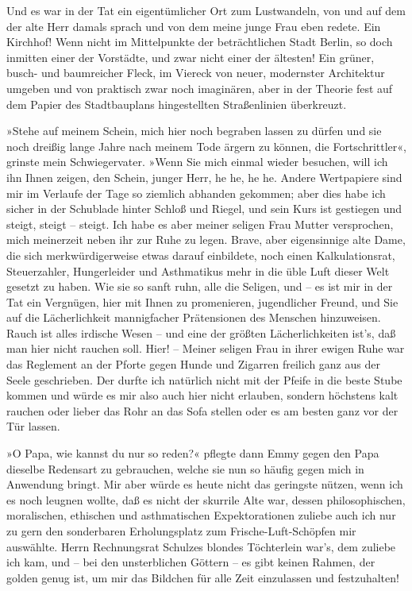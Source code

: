 Und es war in der Tat ein eigentümlicher Ort zum Lustwandeln, von
und auf dem der alte Herr damals sprach und von dem meine junge
Frau eben redete. Ein Kirchhof! Wenn nicht im Mittelpunkte der
beträchtlichen Stadt Berlin, so doch inmitten einer der Vorstädte,
und zwar nicht einer der ältesten! Ein grüner, busch- und
baumreicher Fleck, im Viereck von neuer, modernster Architektur
umgeben und von praktisch zwar noch imaginären, aber in der Theorie
fest auf dem Papier des Stadtbauplans hingestellten Straßenlinien
überkreuzt.

»Stehe auf meinem Schein, mich hier noch begraben lassen zu dürfen
und sie noch dreißig lange Jahre nach meinem Tode ärgern zu können,
die Fortschrittler«, grinste mein Schwiegervater. »Wenn Sie mich
einmal wieder besuchen, will ich ihn Ihnen zeigen, den Schein,
junger Herr, he he, he he. Andere Wertpapiere sind mir im Verlaufe
der Tage so ziemlich abhanden gekommen; aber dies habe ich sicher
in der Schublade hinter Schloß und Riegel, und sein Kurs ist
gestiegen und steigt, steigt – steigt. Ich habe es aber meiner
seligen Frau Mutter versprochen, mich meinerzeit neben ihr zur Ruhe
zu legen. Brave, aber eigensinnige alte Dame, die sich
merkwürdigerweise etwas darauf einbildete, noch einen
Kalkulationsrat, Steuerzahler, Hungerleider und Asthmatikus mehr in
die üble Luft dieser Welt gesetzt zu haben. Wie sie so sanft ruhn,
alle die Seligen, und – es ist mir in der Tat ein Vergnügen, hier
mit Ihnen zu promenieren, jugendlicher Freund, und Sie auf die
Lächerlichkeit mannigfacher Prätensionen des Menschen hinzuweisen.
Rauch ist alles irdische Wesen – und eine der größten
Lächerlichkeiten ist's, daß man hier nicht rauchen soll. Hier! –
Meiner seligen Frau in ihrer ewigen Ruhe war das Reglement an der
Pforte gegen Hunde und Zigarren freilich ganz aus der Seele
geschrieben. Der durfte ich natürlich nicht mit der Pfeife in die
beste Stube kommen und würde es mir also auch hier nicht erlauben,
sondern höchstens kalt rauchen oder lieber das Rohr an das Sofa
stellen oder es am besten ganz vor der Tür lassen.

»O Papa, wie kannst du nur so reden?« pflegte dann Emmy gegen den
Papa dieselbe Redensart zu gebrauchen, welche sie nun so häufig
gegen mich in Anwendung bringt. Mir aber würde es heute nicht das
geringste nützen, wenn ich es noch leugnen wollte, daß es nicht der
skurrile Alte war, dessen philosophischen, moralischen, ethischen
und asthmatischen Expektorationen zuliebe auch ich nur zu gern den
sonderbaren Erholungsplatz zum Frische-Luft-Schöpfen mir auswählte.
Herrn Rechnungsrat Schulzes blondes Töchterlein war's, dem zuliebe
ich kam, und – bei den unsterblichen Göttern – es gibt keinen
Rahmen, der golden genug ist, um mir das Bildchen für alle Zeit
einzulassen und festzuhalten!

